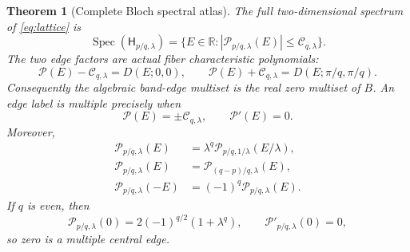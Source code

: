 \documentclass[10pt]{article}
\newtheorem{theorem}{Theorem}
\newcommand{\HH}{\mathsf H}
\newcommand{\PP}{\mathcal P}
\newcommand{\CC}{\mathcal C}
\newcommand{\Spec}{\operatorname{Spec}}
\begin{document}
\begin{theorem}[Complete Bloch spectral atlas]\label{thm:spectrum}
The full two-dimensional spectrum of \eqref{eq:lattice} is
\begin{equation}
 \Spec(\HH_{p/q,\lambda})
 =\{E\in\mathbb R:|\PP_{p/q,\lambda}(E)|\le\CC_{q,\lambda}\}.
 \label{eq:preimage}
\end{equation}
The two edge factors are actual fiber characteristic polynomials:
\begin{equation}
 \PP(E)-\CC_{q,\lambda}=D(E;0,0),\qquad
 \PP(E)+\CC_{q,\lambda}=D(E;\pi/q,\pi/q).
 \label{eq:edgefibers}
\end{equation}
Consequently the algebraic band-edge multiset is the real zero multiset of
$B$.  An
edge label is multiple precisely when
\begin{equation}
 \PP(E)=\pm\CC_{q,\lambda},\qquad \PP'(E)=0.
 \label{eq:contact}
\end{equation}
Moreover,
\begin{align}
 \PP_{p/q,\lambda}(E)
 &=\lambda^q\PP_{p/q,1/\lambda}(E/\lambda),
 \label{eq:duality}\\
 \PP_{p/q,\lambda}(E)&=\PP_{(q-p)/q,\lambda}(E),
 \label{eq:reversal}\\
 \PP_{p/q,\lambda}(-E)&=(-1)^q\PP_{p/q,\lambda}(E).
 \label{eq:parity}
\end{align}
If $q$ is even, then
\begin{equation}
 \PP_{p/q,\lambda}(0)=2(-1)^{q/2}(1+\lambda^q),
 \qquad \PP'_{p/q,\lambda}(0)=0,
 \label{eq:central}
\end{equation}
so zero is a multiple central edge.
\end{theorem}
\end{document}
